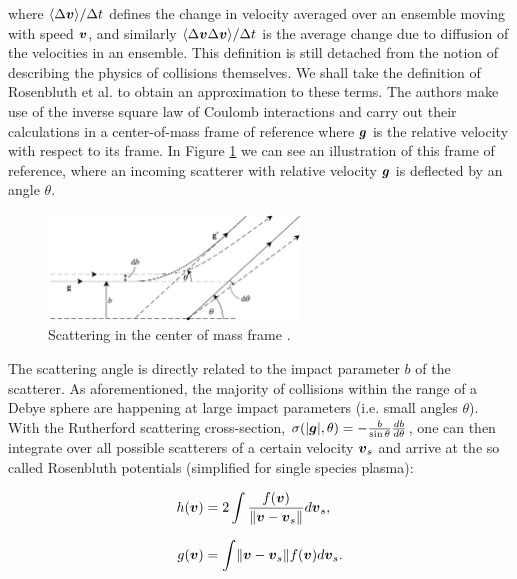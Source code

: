 where $\langle \Delta \boldsymbol{v} \rangle / \Delta t$ defines the change in velocity averaged over an 
ensemble moving with speed $\boldsymbol{v}$, and similarly $\langle \Delta
\boldsymbol{v} \Delta \boldsymbol{v} \rangle / \Delta t$ is the average change due to diffusion of the velocities 
in an ensemble. This definition is still detached from the notion of describing the physics of collisions themselves.
We shall take the definition of Rosenbluth et al. \cite{rosenbluth} to obtain an approximation to these terms.
The authors make use of the inverse square law of Coulomb interactions and carry out their calculations
in a center-of-mass frame of reference where $\boldsymbol{g}$ is the relative velocity with respect to its frame.
In Figure \ref{fig:scatteringCrossSection} we can see an illustration of this frame of reference, where an incoming
scatterer with relative velocity $\boldsymbol{g}$ is deflected by an angle $\theta$.

\begin{figure}[h]
    \begin{center}
        \includegraphics[width=0.60\textwidth]{figures/background/impact_parameter.png}
    \end{center}
    \caption{Scattering in the center of mass frame \cite{boyd_sanderson_2003_chapter84}.}
    \label{fig:scatteringCrossSection}
\end{figure}

The scattering angle is directly related to the impact parameter $b$ of the scatterer. As
aforementioned, the majority of collisions within the range of a Debye sphere are happening at large
impact parameters (i.e. small angles $\theta$).
With the Rutherford scattering cross-section,
$\sigma (\lvert \boldsymbol{g} \rvert, \theta) = - \frac{b}{\sin{\theta}} \frac{db}{d\theta}$,
one can then integrate over all possible scatterers of a certain velocity $\boldsymbol{v}_s$ and arrive at
the so called Rosenbluth potentials (simplified for single species plasma):

\begin{align}
    h(\vect v) &= 2 \int \frac{f(\vect v)}{\lVert \vect v - \vect v_s \rVert} d\vect v_s,
    \label{eq:rbFrictionIntegral} \eqVspace
    g(\vect v) &= \int \lVert \vect v - \vect v_s \rVert f(\vect v) d\vect v_s. \label{eq:rbDiffusionIntegral}
\end{align}

